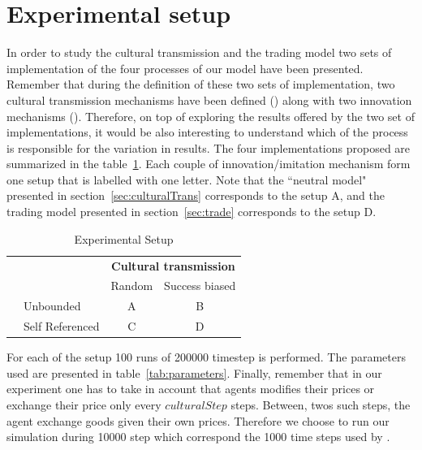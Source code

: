 \documentclass{wscpaperproc}
\begin{document}
\section{Experimental setup}
In order to study the cultural transmission and the trading model two sets of implementation of the four processes of our model have been presented. Remember that during the definition of these two sets of implementation, two cultural transmission mechanisms have been defined () along with two innovation mechanisms (). Therefore, on top of exploring the results offered by the two set of implementations, it would be also interesting to understand which of the process is responsible for the variation in results. The four implementations proposed are summarized in the table~\ref{tab:exp}. Each couple of innovation/imitation mechanism form one setup that is labelled with one letter. Note that the ``neutral model" presented in section~\ref{sec:culturalTrans} corresponds to the setup A, and the trading model presented in section~\ref{sec:trade} corresponds to the setup D.

\begin{table}[h]
	\centering
	\begin{tabular}{ll|cc}
				&	&\multicolumn{2}{c}{\textbf{Cultural transmission}} \\
		\multirow{2}[20]{*}{\rotatebox[origin=c]{90}{\textbf{Innovation}}}&  & Random & Success biased \\\hline  
		& \rule[-0.45cm]{0pt}{1cm} Unbounded 		&A & B \\
		& \rule[-0.45cm]{0pt}{1cm} Self Referenced	& C & D \\
	\end{tabular}
	\caption{Experimental Setup}
	\label{tab:exp}
\end{table}

For each of the setup 100 runs of 200000 timestep is performed. The parameters used are presented in table~\ref{tab:parameters}. Finally, remember that in our experiment one has to take in account that agents modifies their prices or exchange their price only every $culturalStep$ steps. Between, twos such steps, the agent exchange goods given their own prices. Therefore we choose to run our simulation during 10000 step which correspond the 1000 time steps used by \cite{bentley_random_2004,mesoudi_random_2009}.
\end{document}
